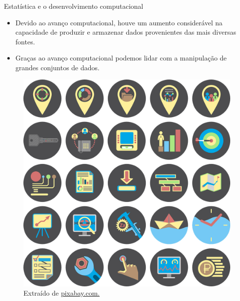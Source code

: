\documentclass[
  ignorenonframetext,
  serif,
  professionalfont,
  usenames,
  dvipsnames,
  aspectratio = 169]{beamer}
\providecommand{\tightlist}{%
  \setlength{\itemsep}{0pt}\setlength{\parskip}{0pt}}
\renewcommand{\tightlist}{%
  \setlength{\itemsep}{0\baselineskip}
  \setlength{\parskip}{0.25\baselineskip}
}
\def\beginAHalfColumn{\begin{minipage}{0.49\textwidth}}%
\def\endColumns{\end{minipage}}%
\begin{document}
\begin{frame}{Estatística e o desenvolvimento computacional}
\label{estatuxedstica-e-o-desenvolvimento-computacional-2}
\beginAHalfColumn

\begin{itemize}
\tightlist
\item
  Devido ao avanço computacional, houve um aumento considerável na
  capacidade de produzir e armazenar dados provenientes das mais
  diversas fontes.
\end{itemize}

\vspace{0.3cm}

\begin{itemize}
\tightlist
\item
  Graças ao avanço computacional podemos lidar com a manipulação de
  grandes conjuntos de dados.
\end{itemize}

\endColumns
\beginAHalfColumn

\begin{figure}

{\centering \includegraphics[width=0.6\linewidth]{./img/ti} 

}

\caption{Extraído de \href{https://cdn.pixabay.com/photo/2015/04/14/23/17/it-business-722950_1280.png}{pixabay.com.}}\label{fig:unnamed-chunk-11}
\end{figure}

\endColumns
\end{frame}
\end{document}
